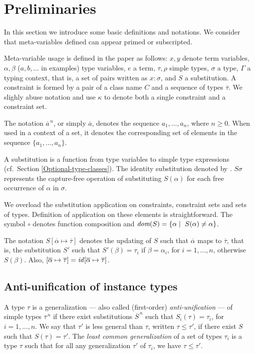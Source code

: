 \section{Preliminaries}\label{prelimirares}

In this section we introduce some basic definitions and notations. We
consider that meta-variables defined can appear primed or subscripted.

Meta-variable usage is defined in the paper as follows: $x,y$ denote
term variables, $\alpha, \beta$ ($a, b,...$
in examples) type variables, $e$ a term,
$\tau,\rho$ simple types, $\sigma$ a type, $\Gamma$ a typing context, 
that is, a set of pairs written as $x:\sigma$, and $S$ a
substitution. A constraint is formed by a pair of a class name $C$ and
a sequence of types $\overline{\tau}$. We slighly abuse notation and 
use $\kappa$ to denote both a single constraint and a constraint set.

The notation $\overline{a}^{\,n}$, or simply $\overline{a}$, denotes the
sequence $a_1,\ldots,a_n$, where $n \geq 0$. When used in a context of
a set, it denotes the corresponding set of elements in the sequence
$\{a_1,\ldots,a_n\}$.

A substitution is a function from type variables to simple type
expressions (cf.~Section \ref{Optional-type-classes}). The identity substitution
denoted by \id. $S\sigma$ represents the capture-free operation of
substituting $S(\alpha)$ for each free occurrence of $\alpha$ in
$\sigma$.

We overload the substitution application on constraints, constraint sets
and sets of types. Definition of application on these elements is
straightforward. The symbol $\circ$ denotes function composition and
$\textit{dom}(S)=\{\alpha \mid\ S(\alpha) \neq \alpha\}$.

The notation $S[\overline{\alpha}\mapsto\overline{\tau}]$ denotes the
updating of $S$ such that $\overline{\alpha}$ maps to
$\overline{\tau}$, that is, the substitution $S'$ such that $S'(\beta)
= \tau_i$ if $\beta = \alpha_i$, for $i = 1,...,n$, otherwise
$S(\beta)$. Also, $[\overline{\alpha}\mapsto\overline{\tau}] =
\text{\it id\/}[\overline{\alpha}\mapsto\overline{\tau}]$.


\subsection{Anti-unification of instance types}
\label{sec:anti-unif}

A type $\tau$ is a generalization --- also called (first-order) 
{\em anti-unification\/} \cite{ModelTheory2012} --- of simple types
$\overline{\tau}^{\,n}$ if there exist substitutions
$\overline{S}^{\,n}$ such that $S_i(\tau)=\tau_i$, for
$i=1,\ldots,n$. We say that $\tau'$ is less general than $\tau$,
written $\tau \leq \tau'$, if there exist $S$ such that $S(\tau) =
\tau'$. The {\it least common generalization} of a set of types
$\tau_i$ is a type $\tau$ such that for all any generalization $\tau'$
of $\tau_i$, we have $\tau \leq \tau'$.

